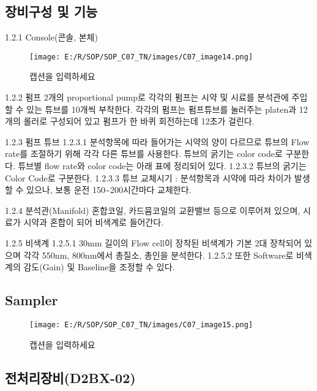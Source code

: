 \documentclass[
]{book}
\begin{document}
\hypertarget{uxc7a5uxbe44uxad6cuxc131-uxbc0f-uxae30uxb2a5-1}{%
\subsection{장비구성 및 기능}\label{uxc7a5uxbe44uxad6cuxc131-uxbc0f-uxae30uxb2a5-1}}

1.2.1 Console(콘솔, 본체)

\begin{figure}
\centering
\texttt{[image: E:/R/SOP/SOP\_C07\_TN/images/C07\_image14.png]}
\caption{캡션을 입력하세요}
\end{figure}

1.2.2 펌프
2개의 proportional pump로 각각의 펌프는 시약 및 시료를 분석관에 주입 할 수 있는 튜브를 10개씩 부착한다. 각각의 펌프는 펌프튜브를 눌러주는 platen과 12개의 롤러로 구성되어 있고 펌프가 한 바퀴 회전하는데 12초가 걸린다.

1.2.3 펌프 튜브
1.2.3.1 분석항목에 따라 들어가는 시약의 양이 다르므로 튜브의 Flow rate를 조절하기 위해 각각 다른 튜브를 사용한다. 튜브의 굵기는 color code로 구분한다. 튜브별 flow rate와 color code는 아래 표에 정리되어 있다.
1.2.3.2 튜브의 굵기는 Color Code로 구분한다.
1.2.3.3 튜브 교체시기 : 분석항목과 시약에 따라 차이가 발생 할 수 있으나, 보통 운전 150\textasciitilde200시간마다 교체한다.

1.2.4 분석관(Manifold)
혼합코일, 카드뮴코일의 교환밸브 등으로 이루어져 있으며, 시료가 시약과 혼합이 되어 비색계로 들어간다.

1.2.5 비색계
1.2.5.1 30mm 길이의 Flow cell이 장착된 비색계가 기본 2대 장착되어 있으며 각각 550nm, 800nm에서 총질소, 총인을 분석한다.
1.2.5.2 또한 Software로 비색계의 감도(Gain) 및 Baseline을 조정할 수 있다.

\hypertarget{sampler-1}{%
\subsection{Sampler}\label{sampler-1}}

\begin{figure}
\centering
\texttt{[image: E:/R/SOP/SOP\_C07\_TN/images/C07\_image15.png]}
\caption{캡션을 입력하세요}
\end{figure}

\hypertarget{uxc804uxcc98uxb9acuxc7a5uxbe44d2bx-02}{%
\subsection{전처리장비(D2BX-02)}\label{uxc804uxcc98uxb9acuxc7a5uxbe44d2bx-02}}
\end{document}
